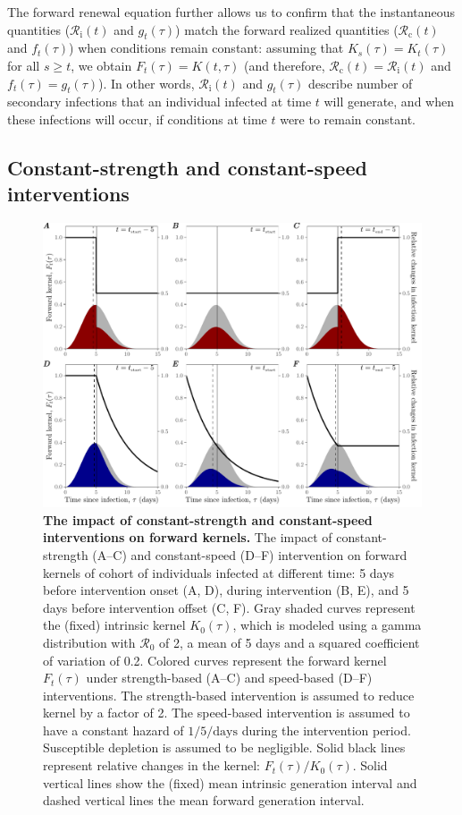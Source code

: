 \documentclass[12pt]{article}
\newcommand{\Rx}[1]{\ensuremath{{\mathcal R}_{#1}}\xspace}
\newcommand{\Ro}{\Rx{0}}
\newcommand{\Rc}{\Rx{\mathrm{c}}}
\newcommand{\Ri}{\Rx{\mathrm{i}}}
\begin{document}
The forward renewal equation further allows us to confirm that the instantaneous quantities ($\Ri(t)$ and $g_t(\tau)$) match the forward realized quantities ($\Rc(t)$ and $f_t(\tau)$) when conditions remain constant:
assuming that $K_s(\tau) = K_t(\tau)$ for all $s \geq t$, we obtain $F_{t}(\tau) = K(t, \tau)$ (and therefore, $\Rc(t) = \Ri(t)$ and $f_{t}(\tau) = g_t(\tau)$).
In other words, $\Ri(t)$ and $g_t(\tau)$ describe number of secondary infections that an individual infected at time $t$ will generate, and when these infections will occur, if conditions at time $t$ were to remain constant.

\subsection{Constant-strength and constant-speed interventions}

\begin{figure}[!th]
\includegraphics[width=1\textwidth]{pop_ind_compare.pdf}
\caption{
\textbf{The impact of constant-strength and constant-speed interventions on forward kernels.}
The impact of constant-strength (A--C) and constant-speed (D--F) intervention on forward kernels of cohort of individuals infected at different time:
5 days before intervention onset (A, D), during intervention (B, E), and 5 days before intervention offset (C, F).
Gray shaded curves represent the (fixed) intrinsic kernel $K_0(\tau)$, which is modeled using a gamma distribution with $\Ro$ of 2, a mean of 5 days and a squared coefficient of variation of 0.2.
Colored curves represent the forward kernel $F_t(\tau)$ under strength-based (A--C) and speed-based (D--F) interventions.
The strength-based intervention is assumed to reduce kernel by a factor of 2.
The speed-based intervention is assumed to have a constant hazard of $1/5/\textrm{days}$ during the intervention period.
Susceptible depletion is assumed to be negligible.
Solid black lines represent relative changes in the kernel: $F_t(\tau)/K_0(\tau)$.
Solid vertical lines show the (fixed) mean intrinsic generation interval and dashed vertical lines the mean forward generation interval.
}
\label{fig:indpop}
\end{figure}
\end{document}
